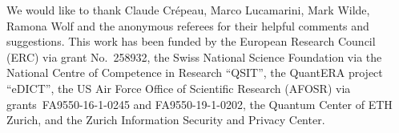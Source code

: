 \documentclass[rmp,aps,reprint,longbibliography]{revtex4-1}
\begin{document}



\begin{acknowledgments}
  We would like to thank Claude Cr\'epeau, Marco Lucamarini, Mark
  Wilde, Ramona Wolf and the anonymous referees for their helpful
  comments and suggestions.  This work has been funded by the European
  Research Council (ERC) via grant No.~258932, the Swiss National
  Science Foundation via the National Centre of Competence in Research
  ``QSIT'', the QuantERA project ``eDICT'', the US Air Force Office of
  Scientific Research (AFOSR) via grants~FA9550-16-1-0245 and
  FA9550-19-1-0202, the Quantum Center of ETH Zurich, and the Zurich
  Information Security and Privacy Center.
\end{acknowledgments}


\appendix







\end{document}
